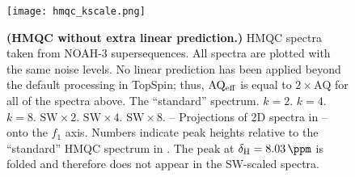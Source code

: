 \begin{figure}
    \centering
    \texttt{[image: hmqc\_kscale.png]}
    {\label{fig:hmqc_kscale_std}}
    {\label{fig:hmqc_kscale_k2}}
    {\label{fig:hmqc_kscale_k4}}
    {\label{fig:hmqc_kscale_k8}}
    {\label{fig:hmqc_kscale_sw2}}
    {\label{fig:hmqc_kscale_sw4}}
    {\label{fig:hmqc_kscale_sw8}}
    {\label{fig:hmqc_kscale_std_proj}}
    {\label{fig:hmqc_kscale_k2_proj}}
    {\label{fig:hmqc_kscale_k4_proj}}
    {\label{fig:hmqc_kscale_k8_proj}}
    {\label{fig:hmqc_kscale_sw2_proj}}
    {\label{fig:hmqc_kscale_sw4_proj}}
    {\label{fig:hmqc_kscale_sw8_proj}}
    \caption{
        \textbf{(HMQC without extra linear prediction.)}
        \nitrogen{} HMQC spectra taken from NOAH-3  supersequences.
        All spectra are plotted with the same noise levels.
        No linear prediction has been applied beyond the default processing in TopSpin; thus, $\mathrm{AQ_{eff}}$ is equal to $2 \times \mathrm{AQ}$ for all of the spectra above.
        \textbf{} The ``standard'' spectrum.
        \textbf{} $k = 2$.
        \textbf{} $k = 4$.
        \textbf{} $k = 8$.
        \textbf{} $\mathrm{SW} \times 2$.
        \textbf{} $\mathrm{SW} \times 4$.
        \textbf{} $\mathrm{SW} \times 8$.
        \textbf{}--\textbf{} Projections of 2D spectra in -- onto the $f_1$ axis.
        Numbers indicate peak heights relative to the ``standard'' HMQC spectrum in .
        The peak at $\delta_{\ce{H}} = \SI{8.03}{\ppm}$ is folded and therefore does not appear in the SW-scaled spectra.
        \grami{}
    }
    \label{fig:hmqc_kscale}
\end{figure}

